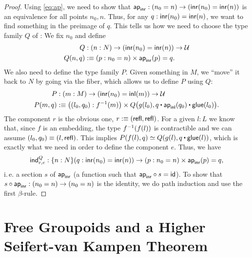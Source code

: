 \begin{proof}
 Using \eqref{eq:ap}, we need to show that $\mathsf{ap}_{\mathsf{inr}} : (n_0 = n) \to (\mathsf{inr}(n_0) = \mathsf{inr}(n))$
 is an equivalence for all points $n_0, n$.
 Thus, for any $q : \mathsf{inr}(n_0) = \mathsf{inr}(n)$, we want to find something in the preimage of $q$.
 This tells us how we need to choose the type family $Q$ of :
 We fix $n_0$ and define
 \begin{align*}
  Q &: (n : N) \to (\inr(n_0) = \inr(n)) \to \UU \\ 
  Q(n,q) &:\equiv (p : n_0 = n) \times \ap_\inr(p) = q. %
 \end{align*}
 We also need to define the type family $P$.
 Given something in $M$, we ``move'' it back to $N$ by going via the fiber, which
 allows us to define $P$ using $Q$:
 \begin{align*}
  P &: (m : M) \to (\inr(n_0) = \inl(m)) \to \UU \\
  P(m,q) &:\equiv \left((l_0, q_0) : f^{-1}(m)\right) \times
      Q\big(g(l_0), q \ct \ap_{\inl}(q_0) \ct \glue(l_0)\big).
 \end{align*}
 The component $r$ is the obvious one,
 $r :\equiv (\mathsf{refl}, \mathsf{refl})$.
 For a given $l:L$ we know that, since $f$ is an embedding, the type $f^{-1}(f(l))$
 is contractible and we can assume $(l_0, q_0) \equiv (l, \mathsf{refl})$.
 This implies $P(f(l),q) \simeq Q(g(l),q \ct \glue(l))$, which is exactly what we
 need in order to define the component $e$.
 Thus, we have 
 \begin{equation*}
  \mathsf{ind}^Q_{r,e} : \{n : N\}(q : \mathsf{inr}(n_0) = \mathsf{inr}(n)) \to (p : n_0 = n) \times \mathsf{ap}_{\mathsf{inr}}(p) = q,
 \end{equation*}
 i.\,e. a section $s$ of $\mathsf{ap}_{\mathsf{inr}}$ (a function such that $\mathsf{ap}_{\mathsf{inr}} \circ s = \mathsf{id}$).
 To show that $s \circ \mathsf{ap}_{\mathsf{inr}} : (n_0 = n) \to (n_0 = n)$ is the identity,
 we do path induction and use the first $\beta$-rule.
\end{proof}

\section{Free Groupoids and a Higher Seifert-van Kampen Theorem}\label{sec:paths-svk}

